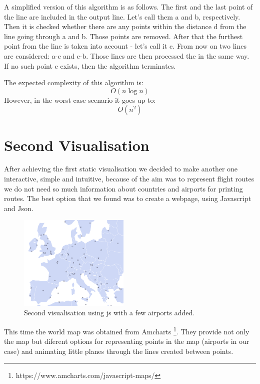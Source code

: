 \documentclass{vldb}
\begin{document}
A simplified version of this algorithm is as follows. 
The first and the last point of the line are included in the output line. 
Let’s call them a and b, respectively. Then it is checked whether there are 
any points within the distance d from the line going through a and b. 
Those points are removed. After that the furthest point from the line is 
taken into account - let’s call it c. From now on two lines are considered: a-c and c-b. 
Those lines are then processed the in the same way. 
If no such point c exists, then the algorithm terminates.

The expected complexity of this algorithm is: \begin{displaymath}{O(n \log n)}\end{displaymath}
However, in the worst case scenario it goes up to: \begin{displaymath}{O(n^2)}\end{displaymath}

\section{Second Visualisation}
After achieving the first static visualisation we decided to make 
another one interactive, simple and intuitive, because of the aim was to 
represent flight routes we do not need so much information 
about countries and airports for printing routes. 
The best option that we found was to create a webpage, using Javascript and Json. 

\begin{figure}
\centering
\includegraphics[width=0.47\textwidth]{js_Europe_center_few_airports}
\caption{Second visualisation using js with a few airports added.}
\label{fig:js_Europe_center_few_airportsi}
\end{figure}

This time the world map was obtained from 
Amcharts \footnote{https://www.amcharts.com/javascript-maps/}. 
They provide not only the map but diferent options for representing 
points in the map (airports in our case) and animating 
little planes through the lines created between points. 
\end{document}
